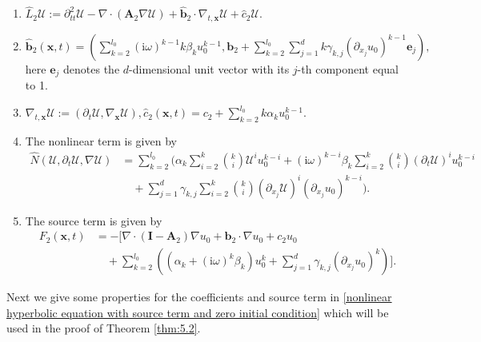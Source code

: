 \documentclass[11pt,reqno,oneside]{amsart}
\numberwithin{equation}{section}
\theoremstyle{definition}
\theoremstyle{remark}
\numberwithin{equation}{section}
\begin{document}
	\begin{enumerate}
		\item $
		\hat{L}_2{\mathscr{U}}:=\partial _{tt}^{2}\mathscr{U}-\nabla \cdot (\mathbf{A}_2\nabla \mathscr{U})+\hat{\mathbf{b}}_2\cdot \nabla_{t,\mathbf{x}} \mathscr{U}+\hat{c}_2\mathscr{U}.
		$	
		\item $\hat{\mathbf{b}}_2(\mathbf{x},t)=\left(\sum_{k=2}^{l_0}\left(\mathrm{i}\omega\right)^{k-1}k\beta_{k}u_0^{k-1},\mathbf{b}_2+\sum_{k=2}^{l_0}\sum_{j=1}^{d}k\gamma_{k,j}\left(\partial_{{x}_j}u_0\right)^{k-1}\mathbf{e}_{j}\right),$ here $\mathbf{e}_{j}$ denotes the $d$-dimensional unit vector with its $j$-th component equal to 1.
		\item $
		\nabla_{t,\mathbf{x}} \mathscr{U}:=\left(\partial_t \mathscr{U},\nabla_\mathbf{x} \mathscr{U}\right),	\hat{c}_2(\mathbf{x},t) = c_2 + \sum_{k=2}^{l_0} k \alpha_k u_{0}^{k-1}.
		$
		
		\item The nonlinear term is given by \begin{align*}
			\hat{N}(\mathscr{U},\partial_{t} \mathscr{U},\nabla \mathscr{U}) \nonumber &= \sum_{k=2}^{l_0} \bigg( \alpha_k \sum_{i=2}^k \binom{k}{i} \mathscr{U}^i u_{0}^{k-i} 
			+ \left(\mathrm{i}\omega\right)^{k-i}\beta_k \sum_{i=2}^k \binom{k}{i} (\partial_t \mathscr{U})^i  u_{0}^{k-i} \nonumber \\
			&\quad +  \sum_{j=1}^d \gamma_{k,j}\sum_{i=2}^k \binom{k}{i} (\partial_{{x}_j} \mathscr{U})^i (\partial_{{x}_j} u_{0})^{k-i} \bigg).
		\end{align*}
		
		\item The source term is given by \begin{align*}\label{expression of source term}
			F_2(\mathbf{x},t) &= -\bigg[ \nabla \cdot \left(  \mathbf{I}-\mathbf{A}_2 \right) \nabla u_0 + \mathbf{b}_2 \cdot \nabla u_0 + c_2 u_0 \nonumber \\
			&\quad + \sum_{k=2}^{l_0} \left( (\alpha_k + \left(\mathrm{i}\omega\right)^k \beta_k) u_{0}^k +  \sum_{j=1}^d \gamma_{k,j}(\partial_{{x}_j} u_{0})^k \right) \bigg].
		\end{align*}
	\end{enumerate}
	Next we give some properties for the coefficients and source term in \eqref{nonlinear hyperbolic equation with source term and zero initial condition} which will be used in the proof of Theorem \ref{thm:5.2}.
\end{document}
